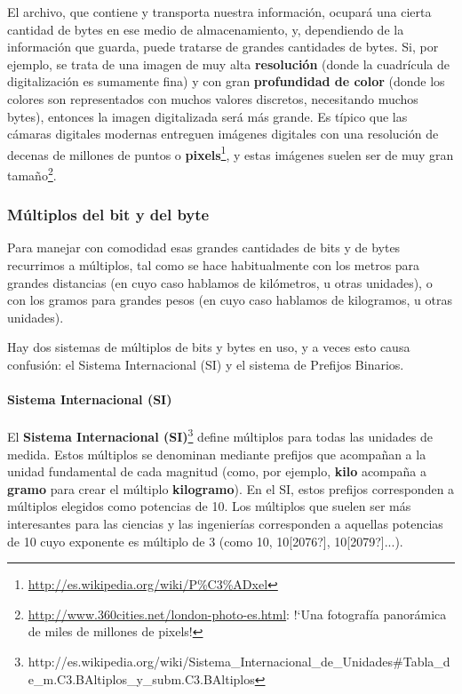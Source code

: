 \documentclass[a4paper]{article}
\begin{document}
El archivo, que contiene y transporta nuestra informaci\'on, ocupar\'a
una cierta cantidad de bytes en ese medio de almacenamiento, y,
dependiendo de la informaci\'on que guarda, puede tratarse de grandes
cantidades de bytes. Si, por ejemplo, se trata de una imagen de muy
alta \textbf{resoluci\'on} (donde la cuadr\'icula de digitalizaci\'on
es sumamente fina) y con gran \textbf{profundidad de color} (donde los
colores son representados con muchos valores discretos, necesitando
muchos bytes), entonces la imagen digitalizada ser\'a m\'as grande. Es
t\'ipico que las c\'amaras digitales modernas entreguen im\'agenes
digitales con una resoluci\'on de decenas de millones de puntos o
\textbf{pixels}\footnote{\href{http://es.wikipedia.org/wiki/P?xel}{http://es.wikipedia.org/wiki/P\%C3\%ADxel}},
y estas im\'agenes suelen ser de muy gran
tama\~no\footnote{\url{http://www.360cities.net/london-photo-es.html}:
!`Una fotograf\'ia panor\'amica de miles de millones de pixels! }.

\subsubsection[M\'ultiplos del bit y del byte]{M\'ultiplos del bit y del
byte}
Para manejar con comodidad esas grandes cantidades de bits y de bytes
recurrimos a m\'ultiplos, tal como se hace habitualmente con los metros
para grandes distancias (en cuyo caso hablamos de kil\'ometros, u otras
unidades), o con los gramos para grandes pesos (en cuyo caso hablamos
de kilogramos, u otras unidades). 

Hay dos sistemas de m\'ultiplos de bits y bytes en uso, y a veces esto
causa confusi\'on: el Sistema Internacional (SI) y el sistema de
Prefijos Binarios.

\paragraph{Sistema Internacional (SI)}
El \textbf{Sistema Internacional
(SI)}\footnote{http://es.wikipedia.org/wiki/Sistema\_Internacional\_de\_Unidades\#Tabla\_de\_m.C3.BAltiplos\_y\_subm.C3.BAltiplos}
define m\'ultiplos para todas las unidades de medida. Estos m\'ultiplos
se denominan mediante prefijos que acompa\~nan a la unidad fundamental
de cada magnitud (como, por ejemplo, \textbf{kilo} acompa\~na a
\textbf{gramo} para crear el m\'ultiplo \textbf{kilogramo}). En el SI,
estos prefijos corresponden a m\'ultiplos elegidos como potencias de
10. Los m\'ultiplos que suelen ser m\'as interesantes para las ciencias
y las ingenier\'ias corresponden a aquellas potencias de 10 cuyo
exponente es m\'ultiplo de 3 (como 10{\textthreesuperior}, 10[2076?],
10[2079?]...).
\end{document}
